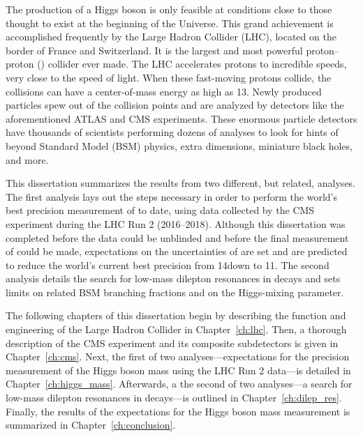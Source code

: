 The production of a Higgs boson is only feasible at conditions close to those thought to exist at the beginning of the Universe.
This grand achievement is accomplished frequently by the Large Hadron Collider (LHC), located on the border of France and Switzerland.
It is the largest and most powerful proton--proton (\pp) collider ever made.
The LHC accelerates protons to incredible speeds, very close to the speed of light.
When these fast-moving protons collide, the \pp collisions can have a center-of-mass energy as high as 13\TeV.
Newly produced particles spew out of the collision points and are analyzed by detectors like the aforementioned ATLAS and CMS experiments.
These enormous particle detectors have thousands of scientists performing dozens of analyses to look for hints of beyond Standard Model (BSM) physics, extra dimensions, miniature black holes, and more.

This dissertation summarizes the results from two different, but related, analyses.
The first analysis lays out the steps necessary in order to perform the world's best precision measurement of \mH to date, using data collected by the CMS experiment during the LHC Run 2 (2016--2018).
Although this dissertation was completed before the data could be unblinded and before the final measurement of \mH could be made,
expectations on the uncertainties of \mH are set and are predicted to reduce the world's current best precision from 14\MeV down to 11\MeV.
The second analysis details the search for low-mass dilepton resonances in \htofourl decays and sets limits on related BSM branching fractions and on the Higgs-mixing parameter.

The following chapters of this dissertation begin by describing the function and engineering of the Large Hadron Collider in Chapter~\ref{ch:lhc}.
Then, a thorough description of the CMS experiment and its composite subdetectors is given in Chapter~\ref{ch:cms}.
Next, the first of two analyses---expectations for the precision measurement of the Higgs boson mass using the LHC Run 2 data---is detailed in Chapter~\ref{ch:higgs_mass}.
Afterwards, a the second of two analyses---a search for low-mass dilepton resonances in \htofourl decays---is outlined in Chapter~\ref{ch:dilep_res}.
Finally, the results of the expectations for the Higgs boson mass measurement is summarized in Chapter~\ref{ch:conclusion}.

